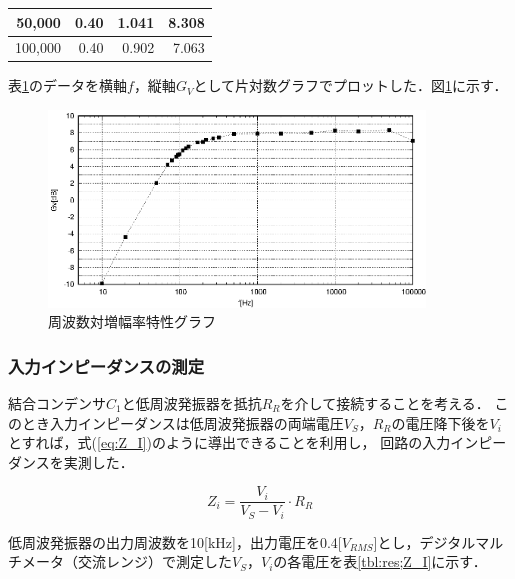 \documentclass[dvipdfmx,titlepage,a4j]{jsarticle}  %
\numberwithin{equation}{section}
\begin{document}
\begin{table}[H]
\begin{center}
\begin{tabular}{r|r|r|r}
      50,000                                   & 0.40                                            & 1.041                                     & 8.308                                  \\ \hline
      100,000                                  & 0.40                                            & 0.902                                     & 7.063                                  \\ \hline
    \end{tabular}
  \end{center}
  \label{tbl:res;f-gain}
\end{table}

表\ref{tbl:res;f-gain}のデータを横軸$f$，縦軸$G_V$として片対数グラフでプロットした．図\ref{fig:f-gv.eps}に示す．

\begin{figure}[H]
  \centering
  \includegraphics[width=10cm]{../gnuplot/f-gv.eps}
  \caption{周波数対増幅率特性グラフ}
  \label{fig:f-gv.eps}
\end{figure}

\subsubsection{入力インピーダンスの測定}
結合コンデンサ$C_1$と低周波発振器を抵抗$R_R$を介して接続することを考える．
このとき入力インピーダンスは低周波発振器の両端電圧$V_S$，$R_R$の電圧降下後を$V_i$とすれば，式(\ref{eq:Z_I})のように導出できることを利用し，
回路の入力インピーダンスを実測した．

\begin{equation}
  Z_i = \frac{V_i}{V_S - V_i} \cdot R_R
  \label{eq:Z_I}
\end{equation}

低周波発振器の出力周波数を10[kHz]，出力電圧を0.4[$V_{RMS}$]とし，デジタルマルチメータ（交流レンジ）で測定した$V_S$，$V_i$の各電圧を表\ref{tbl:res;Z_I}に示す．
\end{document}
